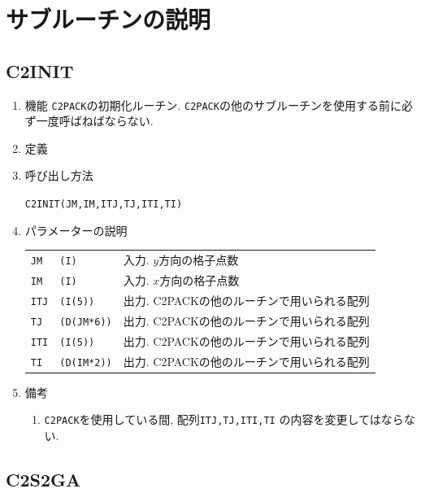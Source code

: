 \documentclass[a4j,fleqn]{jarticle}
\begin{document}
\section{サブルーチンの説明}

\subsection{C2INIT}

\begin{enumerate}

\item 機能 
{\tt C2PACK}の初期化ルーチン. 
{\tt C2PACK}の他のサブルーチンを使用する前に必ず一度呼ばねばならない.

\item 定義

\item 呼び出し方法 
    
{\tt C2INIT(JM,IM,ITJ,TJ,ITI,TI)}
  
\item パラメーターの説明 
    
\begin{tabular}{lll}
{\tt JM} & {\tt (I)} & 入力. $y$方向の格子点数\\
{\tt IM} & {\tt (I)} & 入力. $x$方向の格子点数\\
{\tt ITJ}  & {\tt (I(5))}    & 出力. C2PACKの他のルーチンで用いられる配列\\
{\tt TJ}   & {\tt (D(JM*6))} & 出力. C2PACKの他のルーチンで用いられる配列\\
{\tt ITI}  & {\tt (I(5))}    & 出力. C2PACKの他のルーチンで用いられる配列\\
{\tt TI}   & {\tt (D(IM*2))} & 出力. C2PACKの他のルーチンで用いられる配列
\end{tabular}

\item 備考

\begin{enumerate}
\item {\tt C2PACK}を使用している間, 配列{\tt ITJ,TJ,ITI,TI}
の内容を変更してはならない.
\end{enumerate}

\end{enumerate}


\subsection{C2S2GA}
\end{document}
